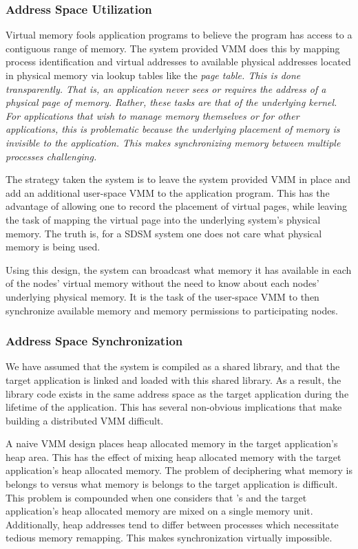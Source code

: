 \subsubsection{Address Space Utilization}
Virtual memory fools application programs to believe the program has access to a contiguous range of memory.  The system provided VMM does this by mapping process identification and virtual addresses to available physical addresses located in physical memory via lookup tables like the \em page table\em.  This is done transparently.  That is, an application never sees or requires the address of a physical page of memory.  Rather, these tasks are that of the underlying kernel.  For applications that wish to manage memory themselves or for other applications, this is problematic because the underlying placement of memory is invisible to the application.  This makes synchronizing memory between multiple processes challenging.

The strategy taken the \projname{} system is to leave the system provided VMM in place and add an additional user-space VMM to the application program.  This has the advantage of allowing one to record the placement of virtual pages, while leaving the task of mapping the virtual page into the underlying system's physical memory.  The truth is, for a SDSM system one does not care what physical memory is being used.

Using this design, the \projname{} system can broadcast what memory it has available in each of the nodes' virtual memory without the need to know about each nodes' underlying physical memory.  It is the task of the user-space VMM to then synchronize available memory and memory permissions to participating nodes.

\subsubsection{Address Space Synchronization}

We have assumed that the \projname{} system is compiled as a shared library, and that the target application is linked and loaded with this shared library.  As a result, the library code exists in the same address space as the target application during the lifetime of the application.  This has several non-obvious implications that make building a distributed VMM difficult.  

A naive VMM design places \projname{} heap allocated memory in the target application's heap area.  This has the effect of mixing \projname{} heap allocated memory with the target application's heap allocated memory.  The problem of deciphering what memory is belongs to \projname{} versus what memory is belongs to the target application is difficult.  This problem is compounded when one considers that \projname{}'s and the target application's heap allocated memory are mixed on a single memory unit.  Additionally, heap addresses tend to differ between processes which necessitate tedious memory remapping.  This makes synchronization virtually impossible.

